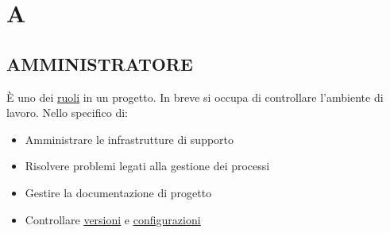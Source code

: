 

	\section{A} \label{sec:A}

		\subsection{AMMINISTRATORE}  \label{amministratore}
		È uno dei \underline{\hyperref[ruoli]{ruoli}} in un progetto. In breve si occupa di controllare l'ambiente di lavoro. Nello specifico di:
		\begin{itemize}
			\item Amministrare le infrastrutture di supporto
			\item Risolvere problemi legati alla gestione dei processi
			\item Gestire la documentazione di progetto
			\item Controllare \underline{\hyperref[versione]{versioni}} e \underline{\hyperref[configurazione]{configurazioni}}
		\end{itemize}

